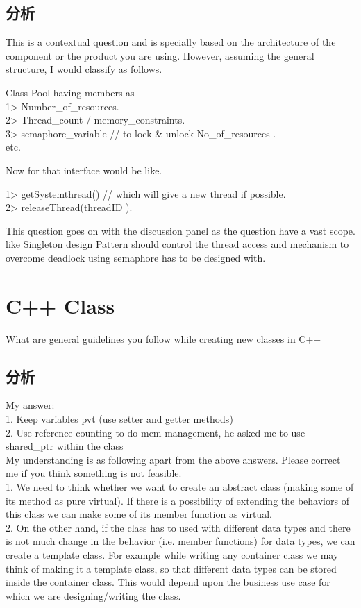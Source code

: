 \subsection{分析}
This is a contextual question and is specially based on the architecture of the component or the product you are using. However, assuming the general structure, I would classify 
as follows. 

Class Pool having members as \\
1> Number_of_resources. \\
2> Thread_count / memory_constraints. \\
3> semaphore_variable // to lock \& unlock No_of_resources . \\
etc. 

Now for that interface would be like. 

1> getSystemthread() // which will give a new thread if possible. \\
2> releaseThread(threadID ). 


This question goes on with the discussion panel as the question have a vast scope. like Singleton design Pattern should control the thread access and mechanism to overcome 
deadlock using semaphore has to be designed with.

\section{C++ Class}
What are general guidelines you follow while creating new classes in C++ 

\subsection{分析}
My answer: \\
1. Keep variables pvt (use setter and getter methods) \\
2. Use reference counting to do mem management, he asked me to use shared_ptr within the class\\

My understanding is as following apart from the above answers. Please correct me if you think something is not feasible. \\
1. We need to think whether we want to create an abstract class (making some of its method as pure virtual). If there is a possibility of extending the behaviors of this class we 
can make some of its member function as virtual. \\
2. On the other hand, if the class has to used with different data types and there is not much change in the behavior (i.e. member functions) for data types, we can create a 
template class. For example while writing any container class we may think of making it a template class, so that different data types can be stored inside the container class. 
This would depend upon the business use case for which we are designing/writing the class.

